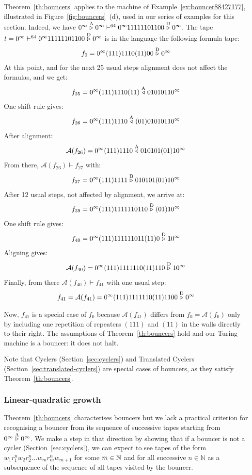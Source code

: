 \begin{example}\label{ex:bouncerTheory}
    Theorem~\ref{th:bouncers} applies to the machine of Example~\ref{ex:bouncer88427177}, illustrated in Figure~\ref{fig:bouncers}~(d), used in our series of examples for this section. Indeed, we have $0^\infty \stackrel{\text{A}}\triangleright 0^\infty \vdash^{64} 0^\infty 11111101100 \stackrel{\text{D}}\triangleright 0^\infty$. The tape $t=0^\infty \vdash^{64} 0^\infty 11111101100 \stackrel{\text{D}}\triangleright 0^\infty$ is in the language the following formula tape:
    $$f_0 = 0^\infty (111)1110(11)00\stackrel{\text{D}}\triangleright0^\infty$$
    At this point, and for the next 25 usual steps alignment does not affect the formulas, and we get: $$f_{25} = 0^\infty (111) 1110 (11) \stackrel{\text{A}}\triangleleft 01010110^\infty$$
    One shift rule gives:
    $$ f_{26} = 0^\infty (111) 1110  \stackrel{\text{A}}\triangleleft (01) 01010110^\infty$$
    After alignment:
    $$ \mathcal{A}(f_{26}) = 0^\infty (111) 1110  \stackrel{\text{A}}\triangleleft 010101(01)10^\infty$$
    From there, $\mathcal{A}(f_{26}) \vdash f_{27}$ with:
    $$ f_{27} = 0^\infty (111) 1111  \stackrel{\text{B}}\triangleright 010101(01)10^\infty$$
    After 12 usual steps, not affected by alignment, we arrive at:
    $$f_{39} = 0^\infty (111)1111110110\stackrel{\text{D}}\triangleright(01)10^\infty$$
    One shift rule gives:
    $$f_{40} = 0^\infty (111)111111011(11)0\stackrel{\text{D}}\triangleright10^\infty$$
    Aligning gives:
    $$\mathcal{A}(f_{40}) = 0^\infty (111)1111110(11)110\stackrel{\text{D}}\triangleright10^\infty$$
    Finally, from there $\mathcal{A}(f_{40}) \vdash f_{41}$ with one usual step:
    $$f_{41} =\mathcal{A}(f_{41}) = 0^\infty (111)1111110(11)1100\stackrel{\text{D}}\triangleright0^\infty$$

    Now, $f_{41}$ is a special case of $f_{0}$ because $\mathcal{A}(f_{41})$ differs from $f_0=\mathcal{A}(f_0)$ only by including one repetition of repeaters $(111)$ and $(11)$ in the walls directly to their right. The assumptions of Theorem~\ref{th:bouncers} hold and our Turing machine is a bouncer: it does not halt.
\end{example}

Note that Cyclers (Section~\ref{sec:cyclers}) and Translated Cyclers (Section~\ref{sec:translated-cyclers}) are special cases of bouncers, as they satisfy Theorem~\ref{th:bouncers}.


\subsubsection{Linear-quadratic growth}

Theorem~\ref{th:bouncers} characterises bouncers but we lack a practical criterion for recognising a bouncer from its sequence of successive tapes starting from $0^\infty \stackrel{\text{A}}\triangleright 0^\infty$. We make a step in that direction by showing that if a bouncer is not a cycler (Section~\ref{sec:cyclers}), we can expect to see tapes of the form $w_1 r_1^n w_2 r_2^n \dots w_m r_m^n w_{m+1}$ for some $m\in\mathbb{N}$ and for all successive $n\in\mathbb{N}$ as a subsequence of the sequence of all tapes visited by the bouncer.


